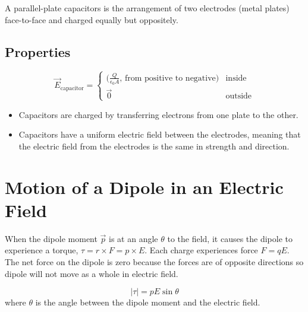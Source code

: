 \documentclass{article}
\begin{document}
A parallel-plate capacitors is the arrangement of two electrodes (metal plates) face-to-face and
charged equally but oppositely.
\subsection*{Properties}

\[\vec{E}_\text{capacitor}=\begin{cases}
    \Big(\frac{Q}{\epsilon_0 A}\text{, from positive to negative}\Big) & \text{inside} \\
    \vec{0} & \text{outside}
\end{cases}\]
\begin{itemize}
    \item Capacitors are charged by transferring electrons from one plate to the other.
    \item Capacitors have a uniform electric field between the electrodes, meaning that the
    electric field from the electrodes is the same in strength and direction.
\end{itemize}

\section*{Motion of a Dipole in an Electric Field}
When the dipole moment $\vec{p}$ is at an angle $\theta$ to the field, it causes the dipole to
experience a torque, $\tau = r\times F = p\times E$. Each charge experiences force $F=qE$. The net
force on the
dipole is zero because the forces are of opposite directions so dipole will not move as a whole in
electric field.

\[|\tau | = pE\sin \theta\] where $\theta$ is the angle between the dipole moment and the
electric field.
\end{document}
